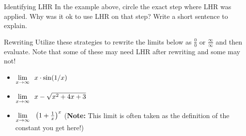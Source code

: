 \begin{exercise}{Identifying LHR \Coffeecup}
In the example above, circle the exact step where LHR was applied.  Why was it ok to use LHR on that step?  Write a short sentence to explain.
\end{exercise}
\begin{exercise}{Rewriting \Coffeecup \Coffeecup \Coffeecup}
Utilize these strategies to rewrite the limits below as $\frac{0}{0}$ or $\frac{\infty}{\infty}$ and then evaluate.  Note that some of these may need LHR after rewriting and some may not!
\begin{itemize}
\item $  {\underset{x \rightarrow \infty}{\lim}}\hspace{.1in} x\cdot \sin (1/x) $
\item $  {\underset{x \rightarrow \infty}{\lim}}\hspace{.1in}  x - \sqrt{x^2+4x+3} $
\item $ \underset{x \rightarrow \infty}{\lim}\hspace{.1in}  \left(1+ \frac{1}{x} \right) ^x $ ({\bf Note: } This limit is often taken as the definition of the constant you get here!)

\end{itemize}
\end{exercise}

